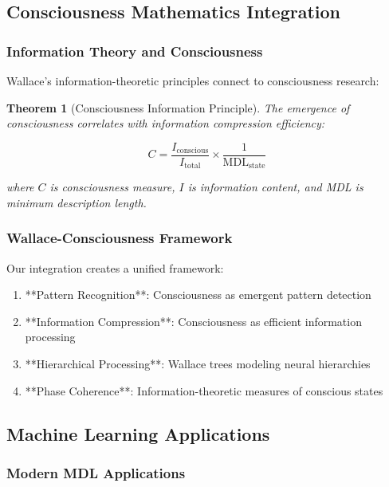 \documentclass[12pt]{article}
\newtheorem{theorem}{Theorem}
\begin{document}
\subsection{Consciousness Mathematics Integration}

\subsubsection{Information Theory and Consciousness}

Wallace's information-theoretic principles connect to consciousness research:

\begin{theorem}[Consciousness Information Principle]
The emergence of consciousness correlates with information compression efficiency:

\begin{equation}
C = \frac{I_{\text{conscious}}}{I_{\text{total}}} \times \frac{1}{\text{MDL}_{\text{state}}}
\end{equation}

where $C$ is consciousness measure, $I$ is information content, and MDL is minimum description length.
\end{theorem}

\subsubsection{Wallace-Consciousness Framework}

Our integration creates a unified framework:

\begin{enumerate}
    \item **Pattern Recognition**: Consciousness as emergent pattern detection
    \item **Information Compression**: Consciousness as efficient information processing
    \item **Hierarchical Processing**: Wallace trees modeling neural hierarchies
    \item **Phase Coherence**: Information-theoretic measures of conscious states
\end{enumerate}

\subsection{Machine Learning Applications}

\subsubsection{Modern MDL Applications}
\end{document}
